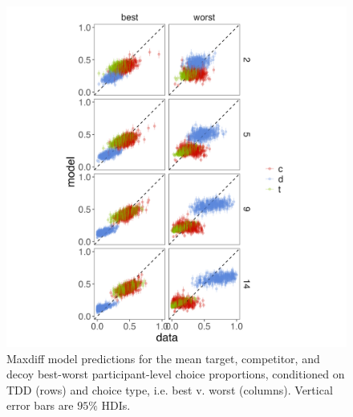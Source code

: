 \begin{figure}
   \includegraphics[width=\linewidth]{figures/maxdiff_2_subjectmeans_model_v_data.jpeg}
   \caption{Maxdiff model predictions for the mean target, competitor, and decoy best-worst participant-level choice proportions, conditioned on TDD (rows) and choice type, i.e. best v. worst (columns). Vertical error bars are $95\%$ HDIs.}
   \label{fig:maxdiff_sub_preds}
\end{figure}


